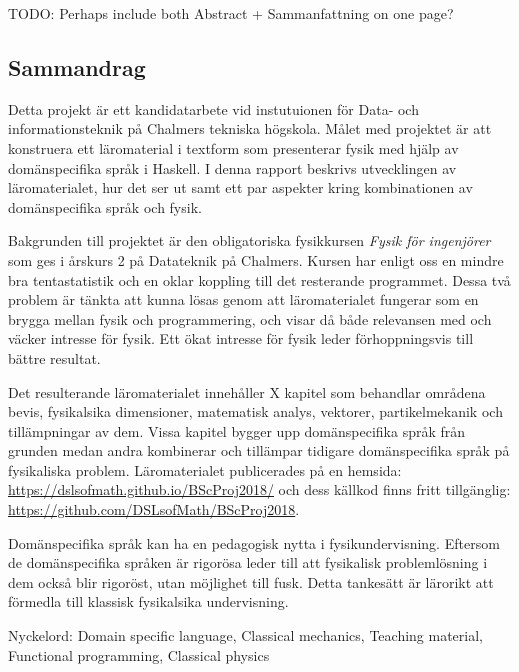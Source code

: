 
\thispagestyle{plain}			%

TODO: Perhaps include both Abstract + Sammanfattning on one page?

\begin{binge}

\section*{Sammandrag}

Detta projekt är ett kandidatarbete vid instutuionen för Data- och informationsteknik på Chalmers tekniska högskola. Målet med projektet är att konstruera ett läromaterial i textform som presenterar fysik med hjälp av domänspecifika språk i Haskell. I denna rapport beskrivs utvecklingen av läromaterialet, hur det ser ut samt ett par aspekter kring kombinationen av domänspecifika språk och fysik.

Bakgrunden till projektet är den obligatoriska fysikkursen \textit{Fysik för ingenjörer} som ges i årskurs 2 på Datateknik på Chalmers. Kursen har enligt oss en mindre bra tentastatistik och en oklar koppling till det resterande programmet. Dessa två problem är tänkta att kunna lösas genom att läromaterialet fungerar som en brygga mellan fysik och programmering, och visar då både relevansen med och väcker intresse för fysik. Ett ökat intresse för fysik leder förhoppningsvis till bättre resultat.

Det resulterande läromaterialet innehåller X kapitel som behandlar områdena bevis, fysikalsika dimensioner, matematisk analys, vektorer, partikelmekanik och tillämpningar av dem. Vissa kapitel bygger upp domänspecifika språk från grunden medan andra kombinerar och tillämpar tidigare domänspecifika språk på fysikaliska problem. Läromaterialet publicerades på en hemsida: \url{https://dslsofmath.github.io/BScProj2018/} och dess källkod finns fritt tillgänglig: \url{https://github.com/DSLsofMath/BScProj2018}.

Domänspecifika språk kan ha en pedagogisk nytta i fysikundervisning. Eftersom de domänspecifika språken är rigorösa leder till att fysikalisk problemlösning i dem också blir rigoröst, utan möjlighet till fusk. Detta tankesätt är lärorikt att förmedla till klassisk fysikalsika undervisning.




\vfill
Nyckelord: Domain specific language, Classical mechanics, Teaching material, Functional programming, Classical physics

\end{binge}

\newpage				%
\thispagestyle{empty}
\mbox{}